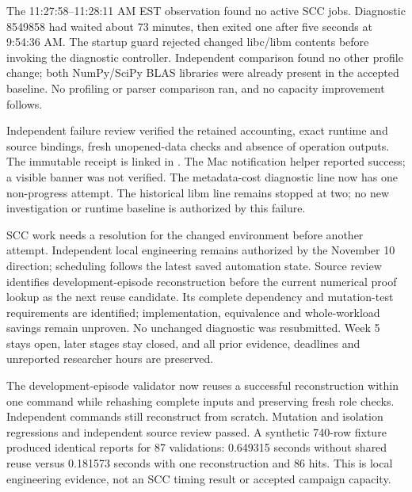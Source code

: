 
The 11:27:58--11:28:11 AM EST observation found no active SCC jobs. Diagnostic
8549858 had waited about 73 minutes, then exited one after five seconds at
9:54:36 AM. The startup guard rejected changed libc/libm contents before invoking
the diagnostic controller. Independent comparison found no other profile change;
both NumPy/SciPy BLAS libraries were already present in the accepted baseline.
No profiling or parser comparison ran, and no capacity improvement follows.

Independent failure review verified the retained accounting, exact runtime and
source bindings, fresh unopened-data checks and absence of operation outputs.
The immutable receipt is linked in .
The Mac notification helper reported success; a visible banner was not verified.
The metadata-cost diagnostic line now has one non-progress attempt. The historical
libm line remains stopped at two; no new investigation or runtime baseline is
authorized by this failure.

SCC work needs a resolution for the changed environment before another attempt.
Independent local engineering remains authorized by the November 10 direction;
scheduling follows the latest saved automation state. Source review identifies development-episode
reconstruction before the current numerical proof lookup as the next reuse
candidate. Its complete dependency and mutation-test requirements are identified;
implementation, equivalence and whole-workload savings remain unproven. No
unchanged diagnostic was resubmitted. Week 5 stays open, later stages stay closed,
and all prior evidence, deadlines and unreported researcher hours are preserved.



The development-episode validator now reuses a successful reconstruction within
one command while rehashing complete inputs and preserving fresh role checks.
Independent commands still reconstruct from scratch. Mutation and isolation
regressions and independent source review passed. A synthetic 740-row fixture
produced identical reports for 87 validations: 0.649315 seconds without shared
reuse versus 0.181573 seconds with one reconstruction and 86 hits. This is local
engineering evidence, not an SCC timing result or accepted campaign capacity.

